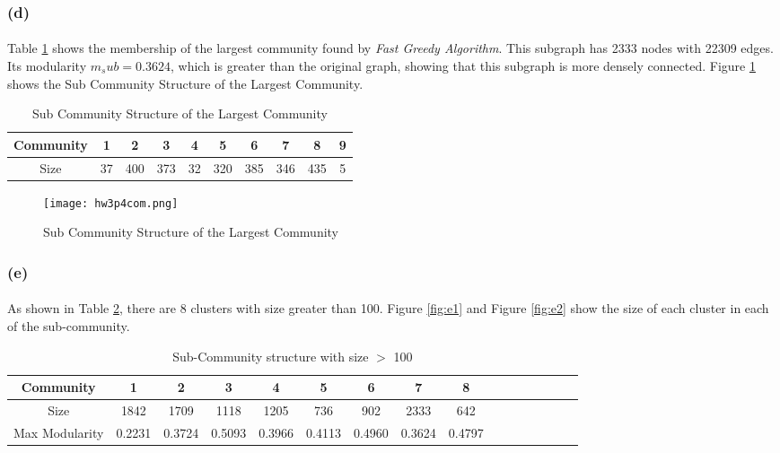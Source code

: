 \subsubsection*{(d)}
\paragraph{}
Table \ref{table:4} shows the membership of the largest community found by \textit{Fast Greedy Algorithm}. This subgraph has 2333 nodes with 22309 edges. Its modularity $m_sub=0.3624$, which is greater than the original graph, showing that this subgraph is more densely connected. Figure \ref{fig:d1} shows the Sub Community Structure of the Largest Community.

\begin{table}[h!]
	\centering
	\begin{tabular}{ |c|c|c|c|c|c|c|c|c|c|}
		\hline
		Community & 1  & 2   & 3   & 4  & 5   & 6   & 7   & 8   & 9  \\ 
		\hline
		Size      & 37 & 400 & 373 & 32 & 320 & 385 & 346 & 435 & 5  \\ 
		\hline
	\end{tabular}
	\caption{Sub Community Structure of the Largest Community}
	\label{table:4}
\end{table}

\begin{figure} [h!]
	\centering
	\texttt{[image: hw3p4com.png]}
	\caption{Sub Community Structure of the Largest Community}
	\label{fig:d1}
\end{figure}

\subsubsection*{(e)}
\paragraph{}
As shown in Table \ref{table:5}, there are 8 clusters with size greater than 100. Figure \ref{fig:e1} and Figure \ref{fig:e2} show the size of each cluster in each of the sub-community.
\begin{table}[h!]
	\centering
	\begin{tabular}{ |c|c|c|c|c|c|c|c|c|c|c|c|c|c|c|c| }
		\hline
		Community      & 1 	 & 2    & 3    & 4    & 5   & 6   & 7    & 8   \\ 
		\hline
		Size           & 1842 & 1709 & 1118 & 1205 & 736 & 902 & 2333 & 642 \\ 
		\hline
		Max Modularity & 0.2231 & 0.3724 & 0.5093 & 0.3966 & 0.4113 & 0.4960 & 0.3624 & 0.4797 \\ 
		\hline
	\end{tabular}
	\caption{Sub-Community structure with size $>$ 100}
	\label{table:5}
\end{table}

